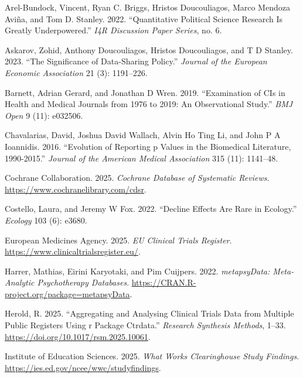 \documentclass[
  11pt,
]{article}
\newlength{\cslhangindent}
\newenvironment{CSLReferences}[2] %
 {\begin{list}{}{%
  \setlength{\itemindent}{0pt}
  \setlength{\leftmargin}{0pt}
  \setlength{\parsep}{0pt}
  \ifodd #1
   \setlength{\leftmargin}{\cslhangindent}
   \setlength{\itemindent}{-1\cslhangindent}
  \fi
  \setlength{\itemsep}{#2\baselineskip}}}
 {\end{list}}
\begin{document}
\protect{}\label{refs}
\begin{CSLReferences}{1}{1}
Arel-Bundock, Vincent, Ryan C. Briggs, Hristos Doucouliagos, Marco
Mendoza Aviña, and Tom D. Stanley. 2022. {``Quantitative {Political
Science Research} Is {Greatly Underpowered}.''} \emph{I4R Discussion
Paper Series}, no. 6.

Askarov, Zohid, Anthony Doucouliagos, Hristos Doucouliagos, and T D
Stanley. 2023. {``The Significance of Data-Sharing Policy.''}
\emph{Journal of the European Economic Association} 21 (3): 1191--226.

Barnett, Adrian Gerard, and Jonathan D Wren. 2019. {``Examination of
{CIs} in Health and Medical Journals from 1976 to 2019: An Observational
Study.''} \emph{BMJ Open} 9 (11): e032506.

Chavalarias, David, Joshua David Wallach, Alvin Ho Ting Li, and John P A
Ioannidis. 2016. {``Evolution of Reporting p Values in the Biomedical
Literature, 1990-2015.''} \emph{Journal of the American Medical
Association} 315 (11): 1141--48.

Cochrane Collaboration. 2025. \emph{Cochrane Database of Systematic
Reviews}. \url{https://www.cochranelibrary.com/cdsr}.

Costello, Laura, and Jeremy W Fox. 2022. {``Decline Effects Are Rare in
Ecology.''} \emph{Ecology} 103 (6): e3680.

European Medicines Agency. 2025. \emph{EU Clinical Trials Register}.
\url{https://www.clinicaltrialsregister.eu/}.

Harrer, Mathias, Eirini Karyotaki, and Pim Cuijpers. 2022.
\emph{metapsyData: Meta-Analytic Psychotherapy Databases}.
\url{https://CRAN.R-project.org/package=metapsyData}.

Herold, R. 2025. {``Aggregating and Analysing Clinical Trials Data from
Multiple Public Registers Using r Package Ctrdata.''} \emph{Research
Synthesis Methods}, 1--33. \url{https://doi.org/10.1017/rsm.2025.10061}.

Institute of Education Sciences. 2025. \emph{What Works Clearinghouse
Study Findings}. \url{https://ies.ed.gov/ncee/wwc/studyfindings}.


\end{CSLReferences}
\end{document}
